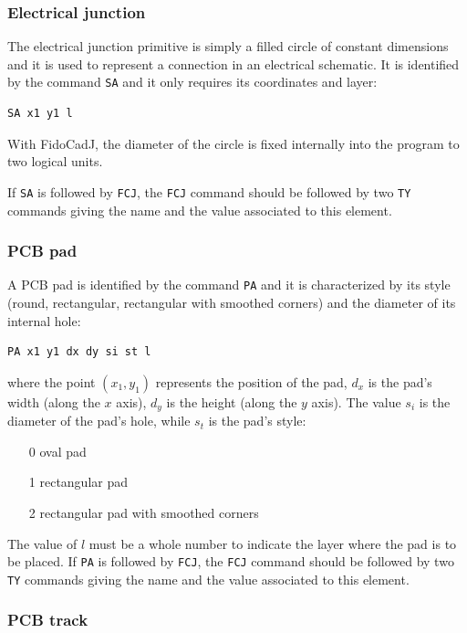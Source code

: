 \documentclass[10pt,a4paper,twoside]{scrreprt}
\begin{document}
\subsubsection{Electrical junction}
The electrical junction primitive is simply a filled
circle of constant dimensions and it is used to represent a connection
in an electrical schematic. It is identified by the command \lstinline!SA!
and it only requires its coordinates and layer:
\begin{lstlisting}
SA x1 y1 l
\end{lstlisting}
With FidoCadJ, the diameter of the circle
is fixed internally into the program to two logical units.

If \lstinline!SA! is followed by \lstinline!FCJ!, the \lstinline!FCJ! command should be followed by two \lstinline!TY! commands giving the name and the value associated to this element.

\subsubsection{PCB pad}

A PCB pad is identified by the command \lstinline!PA!
and it is characterized by its style (round, rectangular, rectangular
with smoothed corners) and the diameter of its internal hole:
\begin{lstlisting}
PA x1 y1 dx dy si st l
\end{lstlisting}
where the point $(x_{1},y_{1})$
represents the position of the pad, $d_{x}$ is the pad's width (along
the $x$ axis), $d_{y}$ is the height (along the $y$ axis). The
value $s_{i}$ is the diameter of the pad's hole, while $s_{t}$ is
the pad's style:
\begin{itemize}
\item [0] oval pad
\item [1] rectangular pad
\item [2] rectangular pad with smoothed corners
\end{itemize}
The value of $l$ must be a whole number to indicate the layer where
the pad is to be placed.
If \lstinline!PA! is followed by \lstinline!FCJ!, the \lstinline!FCJ! command should be followed by two \lstinline!TY! commands giving the name and the value associated to this element.

\subsubsection{PCB track}
\end{document}
